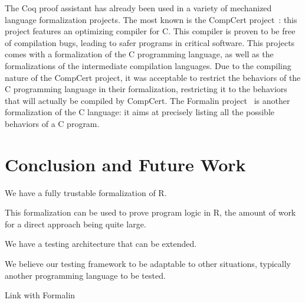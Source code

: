 \documentclass[
    sigplan,
    10pt,
    review, %
    natbib=false %
 ]{acmart}
\begin{document}
The Coq proof assistant has already been used
in a variety of mechanized language formalization projects.
The most known is the CompCert project~\cite{Leroy-Compcert-CACM}:
this project features an optimizing compiler for C.
This compiler is proven to be free of compilation bugs,
leading to safer programs in critical software.
This projects comes with a formalization of the C programming language,
as well as the formalizations of the intermediate compilation languages.
%
Due to the compiling nature of the CompCert project,
it was acceptable to restrict the behaviors of the C programming language
in their formalization,
restricting it to the behaviors that will actually be compiled by CompCert.
The Formalin project~\parencite{formalin} is another formalization
of the C language:
it aims at precisely listing all the possible behaviors of a C program.

\section{Conclusion and Future Work}
\label{sec:conclusion}

We have a fully trustable formalization of R.

This formalization can be used to prove program logic in R,
the amount of work for a direct approach being quite large.

We have a testing architecture that can be extended.

We believe our testing framework to be adaptable to other situations,
typically another programming language to be tested.

Link with Formalin

\printbibliography{}
\end{document}
